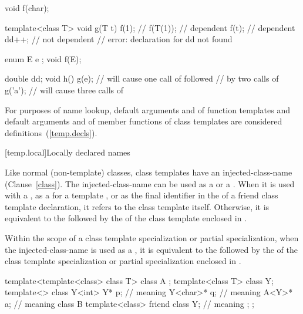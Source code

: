 \begin{codeblock}
void f(char);

template<class T> void g(T t) {
  f(1);             // 
  f(T(1));          // dependent
  f(t);             // dependent
  dd++;             // not dependent
                    // error: declaration for dd not found
}

enum E { e };
void f(E);

double dd;
void h() {
  g(e);             // will cause one call of  followed
                    // by two calls of 
  g('a');           // will cause three calls of 
}
\end{codeblock}
\exitexample

\pnum
\enternote
For purposes of name lookup, default arguments and
 of function templates and default
arguments and  of
member functions of class templates are considered definitions~(\ref{temp.decls}).
\exitnote

[temp.local]{Locally declared names}

\pnum
Like normal (non-template) classes, class templates have an
injected-class-name (Clause~\ref{class}).
The
injected-class-name can be used
as a  or a .
When it is used with a
,
as a  for a template ,
or as the final identifier in the  of
a friend class template declaration,
it refers to the
class template itself. Otherwise, it is equivalent to the 
followed by the  of the class template
enclosed in \tcode{<>}.

\pnum
Within the scope of a class template specialization or
partial specialization, when the injected-class-name is
used as a ,
it is equivalent to the  followed by the
of the class template specialization or partial
specialization enclosed in
\tcode{<>}.
\enterexample
\begin{codeblock}
template<template<class> class T> class A { };
template<class T> class Y;
template<> class Y<int> {
  Y* p;                               // meaning 
  Y<char>* q;                         // meaning 
  A<Y>* a;                            // meaning 
  class B {
    template<class> friend class Y;   // meaning 
  };
};
\end{codeblock}
\exitexample

